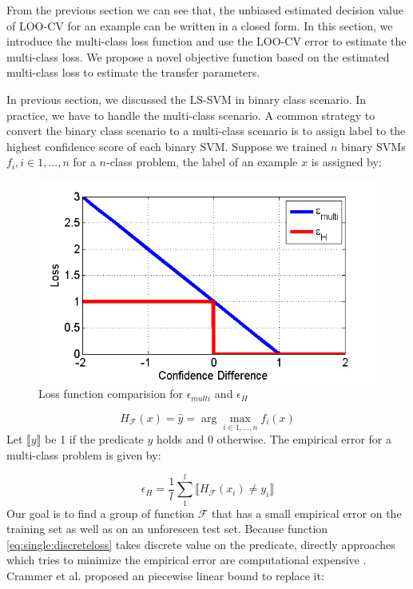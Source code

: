 From the previous section we can see that, the unbiased estimated decision value of LOO-CV for an example can be written in a closed form. In this section, we introduce the multi-class loss function and use the LOO-CV error to estimate the multi-class loss. We propose a novel objective function based on the estimated multi-class loss to estimate the transfer parameters.

In previous section, we discussed the LS-SVM in binary class scenario. In practice, we have to handle the multi-class scenario. A common strategy to convert the binary class scenario to a multi-class scenario is to assign label to the highest confidence score of each binary SVM. Suppose we trained $n$ binary SVMs $f_i,i\in 1,...,n$ for a $n$-class problem, the label of an example $x$ is assigned by:
\begin{figure}
	\centering
	\includegraphics[scale=.7]{transfer/fig/losscmp.png}
	\caption{Loss function comparision for $\epsilon_{multi}$ and $\epsilon_{H}$}\label{fig:single:losscmp}
\end{figure}
\begin{equation}
H_{\mathcal{F}}(x)=\hat{y}=\arg \underset{i \in 1,...,n}{\max}f_i(x)
\end{equation} 
Let $\llbracket y\rrbracket$ be 1 if the predicate $y$ holds and 0 otherwise. The empirical error for a multi-class problem is given by:

\begin{equation} \label{eq:single:discreteloss}
	\epsilon_{H} = \frac{1}{l}\sum_{1}^{l}\llbracket H_{\mathcal{F}}(x_i) \neq y_i \rrbracket
\end{equation}
Our goal is to find a group of function $\mathcal{F}$ that has a small empirical error on the training set as well as on an unforeseen test set. Because function \eqref{eq:single:discreteloss} takes discrete value on the predicate, directly approaches which tries to minimize the empirical error are computational expensive \cite{crammer2002learnability}. Crammer et al. \cite{crammer2002algorithmic} proposed an piecewise linear bound to replace it:

